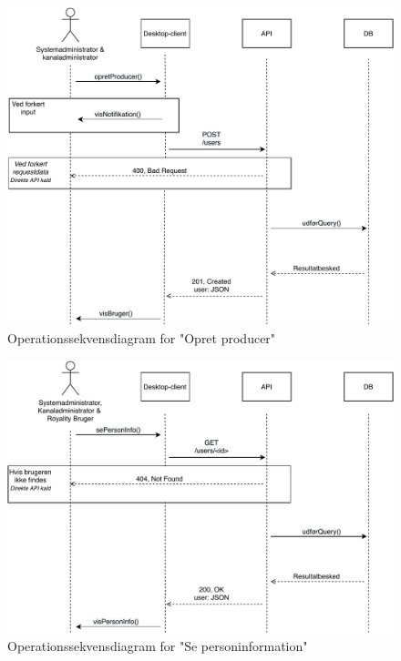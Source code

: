 \begin{figure}[ht]
\centering
\includegraphics[scale=0.7]{figures/Operationssekvensdiagrammer/opretProducer.pdf}
\caption{Operationssekvensdiagram for "Opret producer"}
\label{fig:op_create_producer}
\end{figure}

\begin{figure}[H]
\centering
\includegraphics[scale=0.7]{figures/Operationssekvensdiagrammer/sePersonInfo.pdf}
\caption{Operationssekvensdiagram for "Se personinformation"}
\label{fig:op_read_person_info}
\end{figure}